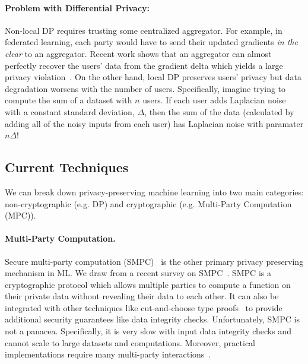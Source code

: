 \paragraph{Problem with Differential Privacy:} Non-local DP requires trusting some centralized aggregator.
For example, in federated learning, each party would have to send their updated gradients \emph{in the clear} to an aggregator.
Recent work shows that an aggregator can almost perfectly recover the users' data from the gradient delta which yields a large privacy violation~\cite{gupta2022recoveringprivatetextfederated}.
On the other hand, local DP preserves users' privacy but data degradation worsens with the number of users.
Specifically, imagine trying to compute the sum of a dataset with $n$ users.
If each user adds Laplacian noise with a constant standard deviation, $\Delta$, then the sum of the data (calculated by adding all of the noisy inputs from each user) has Laplacian noise with paramater $n \Delta$!


\subsection{Current Techniques}
We can break down privacy-preserving machine learning into two main categories: non-cryptographic (e.g. DP) and cryptographic (e.g. Multi-Party Computation (MPC)).


\paragraph{Multi-Party Computation.}
Secure multi-party computation (SMPC)~\cite{yao1986generate} is the other primary privacy preserving mechanism in ML.
We draw from a recent survey on SMPC~\cite{zhou2024secure}.
SMPC is a cryptographic protocol which allows multiple parties to compute a function on their private data without revealing their data to each other.
It can also be integrated with other techniques like cut-and-choose type proofs~\cite{lindell2016fast} to provide additional security guarantees like data integrity checks.
Unfortunately, SMPC is not a panacea.
Specifically, it is very slow with input data integrity checks and cannot scale to large datasets and computations.
Moreover, practical implementations require many multi-party interactions~\cite{zhao2019secure}.

